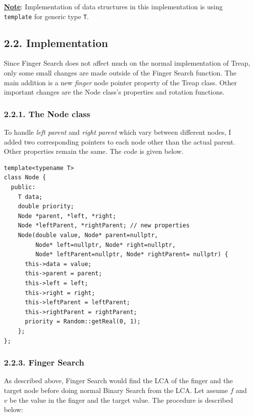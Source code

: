 \documentclass[12pt,english,]{article}
\newcommand{\code}[1]{\colorbox{light-gray}{\texttt{#1}}}
\begin{document}
\underline{\textbf{Note}}: Implementation of data structures in this
implementation is using \code{template} for generic type \code{T}.

\hypertarget{implementation}{%
\subsection{2.2. Implementation}\label{implementation}}

Since Finger Search does not affect much on the normal implementation of
Treap, only some small changes are made outside of the Finger Search
function. The main addition is a new \emph{finger} node pointer property
of the Treap class. Other important changes are the Node class's
properties and rotation functions.

\hypertarget{the-node-class}{%
\subsubsection{2.2.1. The Node class}\label{the-node-class}}

To handle \emph{left parent} and \emph{right parent} which vary between
different nodes, I added two corresponding pointers to each node other
than the actual parent. Other properties remain the same. The code is
given below.

\begin{lstlisting}
template<typename T>
class Node {
  public:
    T data;
    double priority;
    Node *parent, *left, *right;
    Node *leftParent, *rightParent; // new properties
    Node(double value, Node* parent=nullptr,
         Node* left=nullptr, Node* right=nullptr,
         Node* leftParent=nullptr, Node* rightParent= nullptr) {
      this->data = value;
      this->parent = parent;
      this->left = left;
      this->right = right;
      this->leftParent = leftParent;
      this->rightParent = rightParent;
      priority = Random::getReal(0, 1);
    };
};
\end{lstlisting}
\vspace{-7mm}

\hypertarget{finger-search}{%
\subsubsection{2.2.3. Finger Search}\label{finger-search}}

As described above, Finger Search would find the LCA of the finger and
the target node before doing normal Binary Search from the LCA. Let
assume \(f\) and \(v\) be the value in the finger and the target value.
The procedure is described below:
\end{document}
